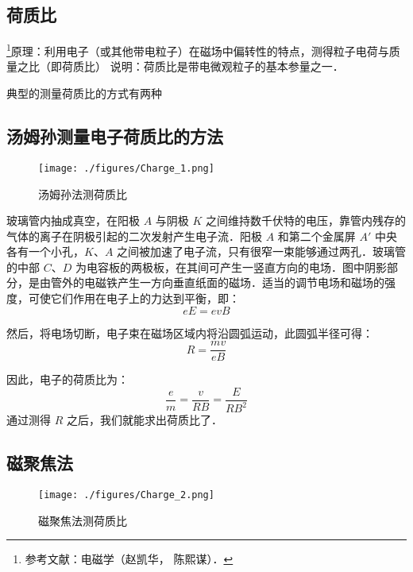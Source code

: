 

\subsection{荷质比}
\footnote{参考文献：电磁学（赵凯华， 陈熙谋）． }原理：利用电子（或其他带电粒子）在磁场中偏转性的特点，测得粒子电荷与质量之比（即荷质比）
说明：荷质比是带电微观粒子的基本参量之一．

典型的测量荷质比的方式有两种

\subsection{汤姆孙测量电子荷质比的方法}

\begin{figure}[ht]
\centering
\texttt{[image: ./figures/Charge\_1.png]}
\caption{汤姆孙法测荷质比} \label{Charge_fig1}
\end{figure}

玻璃管内抽成真空，在阳极 $A$ 与阴极 $K$ 之间维持数千伏特的电压，靠管内残存的气体的离子在阴极引起的二次发射产生电子流．阳极 $A$ 和第二个金属屏 $A'$ 中央各有一个小孔，$K$、$A$ 之间被加速了电子流，只有很窄一束能够通过两孔．玻璃管的中部 $C$、$D$ 为电容板的两极板，在其间可产生一竖直方向的电场．图中阴影部分，是由管外的电磁铁产生一方向垂直纸面的磁场．适当的调节电场和磁场的强度，可使它们作用在电子上的力达到平衡，即：
\begin{equation}
eE=evB
\end{equation}

然后，将电场切断，电子束在磁场区域内将沿圆弧运动，此圆弧半径可得：
\begin{equation}
R=\frac {mv}{eB}
\end{equation}

因此，电子的荷质比为：
\begin{equation}
\frac{e}{m}=\frac{v}{RB}=\frac {E}{RB^2}
\end{equation}
通过测得 $R$ 之后，我们就能求出荷质比了．

\subsection{磁聚焦法}

\begin{figure}[ht]
\centering
\texttt{[image: ./figures/Charge\_2.png]}
\caption{磁聚焦法测荷质比} \label{Charge_fig2}
\end{figure}

